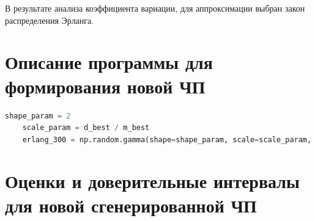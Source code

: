\documentclass{article}
\begin{document}
В результате анализа коэффициента вариации, для аппроксимации выбран закон распределения Эрланга.

\section{Описание программы для формирования новой ЧП}

\begin{lstlisting}[language=Python]
    shape_param = 2
    scale_param = d_best / m_best
    erlang_300 = np.random.gamma(shape=shape_param, scale=scale_param, size=300).tolist()
\end{lstlisting}

\section{Оценки и доверительные интервалы для новой сгенерированной ЧП}
\end{document}
